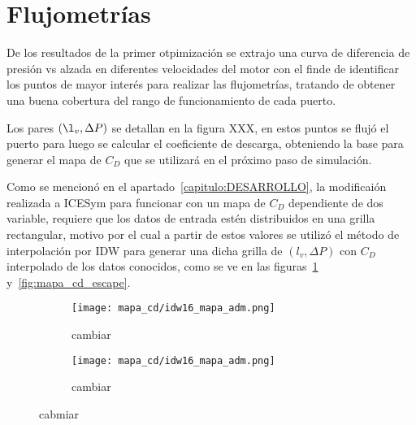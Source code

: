 \section{Flujometrías}

De los resultados de la primer otpimización se extrajo una curva de diferencia
de presión vs alzada en diferentes velocidades del motor con el finde de
identificar los puntos de mayor interés para realizar las flujometrías,
tratando de obtener una buena cobertura del rango de funcionamiento de cada
puerto.


Los pares $(\l_{v}, \Delta P)$ se detallan en la figura XXX, en estos puntos se
flujó el puerto para luego se calcular el coeficiente de descarga, obteniendo
la base para generar el mapa de $C_D$ que se utilizará en el próximo paso de
simulación.

Como se mencionó en el apartado~\ref{capitulo:DESARROLLO}, la modificaión
realizada a ICESym para funcionar con un mapa de $C_{D}$ dependiente de dos
variable, requiere que los datos de entrada estén distribuidos en una grilla
rectangular, motivo por el cual a partir de estos valores se utilizó el método
de interpolación por IDW para generar una dicha grilla de $(l_{v}, \Delta P)$
con $C_{D}$ interpolado de los datos conocidos, como se ve en las
figuras~\ref{fig:mapa_cd_admision} y~\ref{fig:mapa_cd_escape}.

\begin{figure}
    \centering
    \begin{subfigure}{0.4\textwidth}
        \centering
        \texttt{[image: mapa\_cd/idw16\_mapa\_adm.png]}
        \caption{cambiar}
    \end{subfigure}
    \hfill
    \begin{subfigure}{0.4\textwidth}
        \centering
        \texttt{[image: mapa\_cd/idw16\_mapa\_adm.png]}
        \caption{cambiar}
    \end{subfigure}
    \caption{cabmiar}\label{fig:mapa_cd_admision}
\end{figure}

